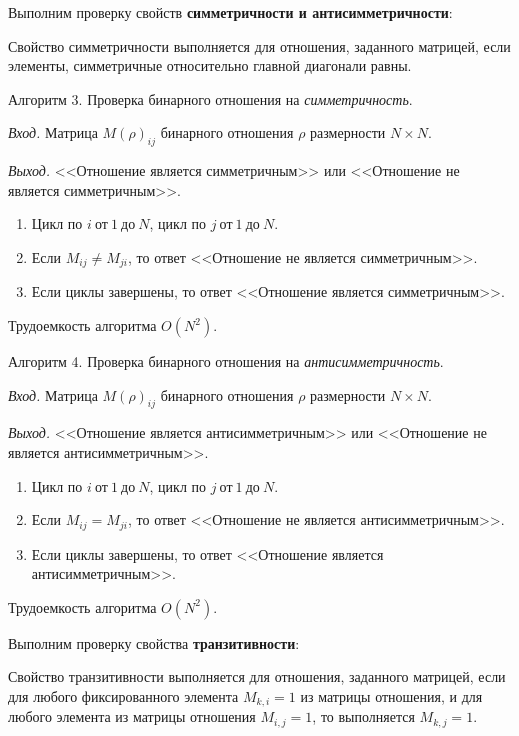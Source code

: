 \documentclass[bachelor, och, labwork]{shiza}
\begin{document}
Выполним проверку свойств \textbf{симметричности и антисимметричности}:

Свойство симметричности выполняется для отношения, заданного матрицей, если
элементы, симметричные относительно главной диагонали равны.

Алгоритм 3. Проверка бинарного отношения на \textit{симметричность}.

\textit{Вход.} Матрица $M(\rho)_{ij}$ бинарного отношения $\rho$ размерности
$N \times N$.

\textit{Выход.} <<Отношение является симметричным>> или <<Отношение не является
симметричным>>.

\begin{enumerate}
    \item Цикл по $i ~\text{от}~ 1 ~\text{до}~ N$, 
    цикл по $j ~\text{от}~ 1 ~\text{до}~ N$.

    \item Если $M_{ij} \not= M_{ji}$, то ответ <<Отношение не является симметричным>>.
    
    \item Если циклы завершены, то ответ <<Отношение является симметричным>>.

\end{enumerate}
Трудоемкость алгоритма $O(N^2)$.

Алгоритм 4. Проверка бинарного отношения на \textit{антисимметричность}.

\textit{Вход.} Матрица $M(\rho)_{ij}$ бинарного отношения $\rho$ размерности
$N \times N$.

\textit{Выход.} <<Отношение является антисимметричным>> или <<Отношение не является
антисимметричным>>.

\begin{enumerate}
    \item Цикл по $i ~\text{от}~ 1 ~\text{до}~ N$, 
    цикл по $j ~\text{от}~ 1 ~\text{до}~ N$.

    \item Если $M_{ij} = M_{ji}$, то ответ <<Отношение не является антисимметричным>>.
    
    \item Если циклы завершены, то ответ <<Отношение является антисимметричным>>.

\end{enumerate}
Трудоемкость алгоритма $O(N^2)$.

Выполним проверку свойства \textbf{транзитивности}:

Свойство транзитивности выполняется для отношения, заданного матрицей, если для 
любого фиксированного элемента $M_{k,i}=1$ из матрицы отношения, и для любого
элемента из матрицы отношения $M_{i,j}=1$, то выполняется $M_{k,j}=1$.
\end{document}
